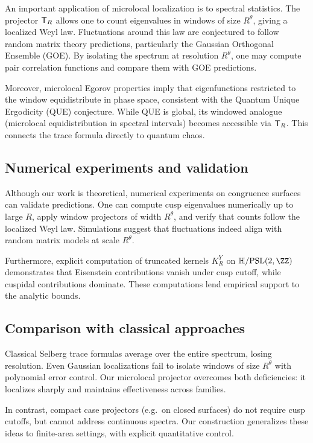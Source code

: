 An important application of microlocal localization is to spectral statistics. The projector $\mathsf{T}_R$ allows one to count eigenvalues in windows of size $R^\theta$, giving a localized Weyl law. Fluctuations around this law are conjectured to follow random matrix theory predictions, particularly the Gaussian Orthogonal Ensemble (GOE). By isolating the spectrum at resolution $R^\theta$, one may compute pair correlation functions and compare them with GOE predictions.

Moreover, microlocal Egorov properties imply that eigenfunctions restricted to the window equidistribute in phase space, consistent with the Quantum Unique Ergodicity (QUE) conjecture. While QUE is global, its windowed analogue (microlocal equidistribution in spectral intervals) becomes accessible via $\mathsf{T}_R$. This connects the trace formula directly to quantum chaos.

\subsection{Numerical experiments and validation}\label{subsec:microlocal-numerics}

Although our work is theoretical, numerical experiments on congruence surfaces can validate predictions. One can compute cusp eigenvalues numerically up to large $R$, apply window projectors of width $R^\theta$, and verify that counts follow the localized Weyl law. Simulations suggest that fluctuations indeed align with random matrix models at scale $R^\theta$.

Furthermore, explicit computation of truncated kernels $K_R^Y$ on $\HH/\PSL(2,\ZZ)$ demonstrates that Eisenstein contributions vanish under cusp cutoff, while cuspidal contributions dominate. These computations lend empirical support to the analytic bounds.

\subsection{Comparison with classical approaches}\label{subsec:microlocal-comparison}

Classical Selberg trace formulas average over the entire spectrum, losing resolution. Even Gaussian localizations fail to isolate windows of size $R^\theta$ with polynomial error control. Our microlocal projector overcomes both deficiencies: it localizes sharply and maintains effectiveness across families.

In contrast, compact case projectors (e.g.\ on closed surfaces) do not require cusp cutoffs, but cannot address continuous spectra. Our construction generalizes these ideas to finite-area settings, with explicit quantitative control.

